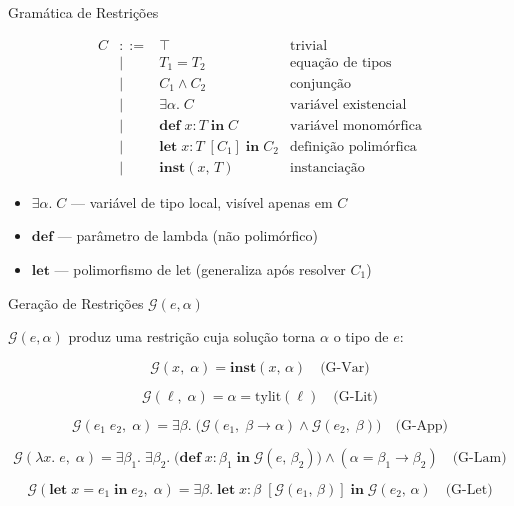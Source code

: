 \begin{frame}{Gramática de Restrições}

    \[\begin{array}{rcll}
    C & ::= & \top & \text{trivial} \\
    & \mid & T_1 = T_2 & \text{equação de tipos} \\
    & \mid & C_1 \wedge C_2 & \text{conjunção} \\
    & \mid & \exists \alpha.\; C & \text{variável existencial} \\
    & \mid & \mathbf{def}\; x : T\; \mathbf{in}\; C & \text{variável monomórfica} \\
    & \mid & \mathbf{let}\; x : T\; [C_1]\; \mathbf{in}\; C_2 & \text{definição polimórfica} \\
    & \mid & \mathbf{inst}(x,\, T) & \text{instanciação}
\end{array}\]

\begin{itemize}

    \item
    \(\exists \alpha.\; C\) --- variável de tipo local, visível apenas em
    \(C\)
    \item
    \(\mathbf{def}\) --- parâmetro de lambda (não polimórfico)
    \item
    \(\mathbf{let}\) --- polimorfismo de let (generaliza após resolver
    \(C_1\))
\end{itemize}
\end{frame}

\begin{frame}{Geração de Restrições \(\mathcal{G}(e, \alpha)\)}

    \(\mathcal{G}(e, \alpha)\) produz uma restrição cuja solução torna
    \(\alpha\) o tipo de \(e\):

    \[\mathcal{G}(x,\; \alpha) = \mathbf{inst}(x,\, \alpha) \quad\text{(G-Var)}\]

    \[\mathcal{G}(\ell,\; \alpha) = \alpha = \mathrm{tylit}(\ell) \quad\text{(G-Lit)}\]

    \[\mathcal{G}(e_1\; e_2,\; \alpha) = \exists \beta.\;\bigl(\mathcal{G}(e_1,\; \beta \to \alpha) \wedge \mathcal{G}(e_2,\; \beta)\bigr) \quad\text{(G-App)}\]

    \[\mathcal{G}(\lambda x.\; e,\; \alpha) = \exists \beta_1.\; \exists \beta_2.\; \bigl(\mathbf{def}\; x : \beta_1\; \mathbf{in}\; \mathcal{G}(e,\, \beta_2)\bigr) \wedge (\alpha = \beta_1 \to \beta_2) \quad\text{(G-Lam)}\]

    \[\mathcal{G}(\mathbf{let}\; x = e_1\; \mathbf{in}\; e_2,\; \alpha) = \exists \beta.\; \mathbf{let}\; x : \beta\; [\mathcal{G}(e_1,\, \beta)]\; \mathbf{in}\; \mathcal{G}(e_2,\, \alpha) \quad\text{(G-Let)}\]
\end{frame}

